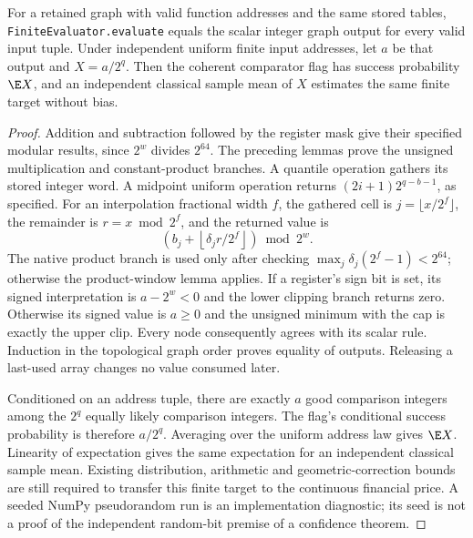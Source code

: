 \begin{proposition}
For a retained graph with valid function addresses and the same stored
tables, \texttt{FiniteEvaluator.evaluate} equals the scalar integer graph
output for every valid input tuple. Under independent uniform finite input
addresses, let $a$ be that output and $X=a/2^q$. Then the coherent comparator
flag has success probability $\E X$, and an independent classical sample
mean of $X$ estimates the same finite target without bias.
\end{proposition}
\begin{proof}
Addition and subtraction followed by the register mask give their specified
modular results, since $2^w$ divides $2^{64}$. The preceding lemmas prove the
unsigned multiplication and constant-product branches. A quantile operation
gathers its stored integer word. A midpoint uniform operation returns
$(2i+1)2^{q-b-1}$, as specified. For an interpolation fractional width $f$,
the gathered cell is $j=\lfloor x/2^f\rfloor$, the remainder is
$r=x\bmod2^f$, and the returned value is
\[
 \left(b_j+\left\lfloor\delta_jr/2^f\right\rfloor\right)\bmod2^w.
\]
The native product branch is used only after checking
$\max_j\delta_j(2^f-1)<2^{64}$; otherwise the product-window lemma applies.
If a register's sign bit is set, its signed interpretation is $a-2^w<0$
and the lower clipping branch returns zero. Otherwise its signed value is
$a\geq0$ and the unsigned minimum with the cap is exactly the upper clip.
Every node consequently agrees with its scalar rule. Induction in the
topological graph order proves equality of outputs. Releasing a last-used
array changes no value consumed later.

Conditioned on an address tuple, there are exactly $a$ good comparison
integers among the $2^q$ equally likely comparison integers. The flag's
conditional success probability is therefore $a/2^q$. Averaging over the
uniform address law gives $\E X$. Linearity of expectation gives the same
expectation for an independent classical sample mean. Existing distribution,
arithmetic and geometric-correction bounds are still required to transfer
this finite target to the continuous financial price. A seeded NumPy
pseudorandom run is an implementation diagnostic; its seed is not a proof of
the independent random-bit premise of a confidence theorem.
\end{proof}

